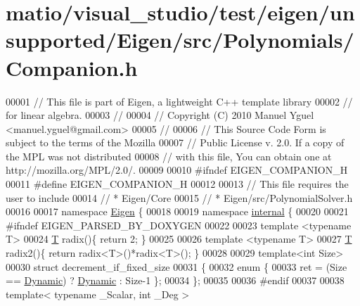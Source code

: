 \hypertarget{matio_2visual__studio_2test_2eigen_2unsupported_2_eigen_2src_2_polynomials_2_companion_8h_source}{}\section{matio/visual\+\_\+studio/test/eigen/unsupported/\+Eigen/src/\+Polynomials/\+Companion.h}
\label{matio_2visual__studio_2test_2eigen_2unsupported_2_eigen_2src_2_polynomials_2_companion_8h_source}

\begin{DoxyCode}
00001 \textcolor{comment}{// This file is part of Eigen, a lightweight C++ template library}
00002 \textcolor{comment}{// for linear algebra.}
00003 \textcolor{comment}{//}
00004 \textcolor{comment}{// Copyright (C) 2010 Manuel Yguel <manuel.yguel@gmail.com>}
00005 \textcolor{comment}{//}
00006 \textcolor{comment}{// This Source Code Form is subject to the terms of the Mozilla}
00007 \textcolor{comment}{// Public License v. 2.0. If a copy of the MPL was not distributed}
00008 \textcolor{comment}{// with this file, You can obtain one at http://mozilla.org/MPL/2.0/.}
00009 
00010 \textcolor{preprocessor}{#ifndef EIGEN\_COMPANION\_H}
00011 \textcolor{preprocessor}{#define EIGEN\_COMPANION\_H}
00012 
00013 \textcolor{comment}{// This file requires the user to include}
00014 \textcolor{comment}{// * Eigen/Core}
00015 \textcolor{comment}{// * Eigen/src/PolynomialSolver.h}
00016 
00017 \textcolor{keyword}{namespace }\hyperlink{namespace_eigen}{Eigen} \{ 
00018 
00019 \textcolor{keyword}{namespace }\hyperlink{namespaceinternal}{internal} \{
00020 
00021 \textcolor{preprocessor}{#ifndef EIGEN\_PARSED\_BY\_DOXYGEN}
00022 
00023 \textcolor{keyword}{template} <\textcolor{keyword}{typename} T>
00024 \hyperlink{group___sparse_core___module_class_eigen_1_1_triplet}{T} radix()\{ \textcolor{keywordflow}{return} 2; \}
00025 
00026 \textcolor{keyword}{template} <\textcolor{keyword}{typename} T>
00027 \hyperlink{group___sparse_core___module_class_eigen_1_1_triplet}{T} radix2()\{ \textcolor{keywordflow}{return} radix<T>()*radix<T>(); \}
00028 
00029 \textcolor{keyword}{template}<\textcolor{keywordtype}{int} Size>
00030 \textcolor{keyword}{struct }decrement\_if\_fixed\_size
00031 \{
00032   \textcolor{keyword}{enum} \{
00033     ret = (Size == \hyperlink{namespace_eigen_ad81fa7195215a0ce30017dfac309f0b2}{Dynamic}) ? \hyperlink{namespace_eigen_ad81fa7195215a0ce30017dfac309f0b2}{Dynamic} : Size-1 \};
00034 \};
00035 
00036 \textcolor{preprocessor}{#endif}
00037 
00038 \textcolor{keyword}{template}< \textcolor{keyword}{typename} \_Scalar, \textcolor{keywordtype}{int} \_Deg >

\end{DoxyCode}
